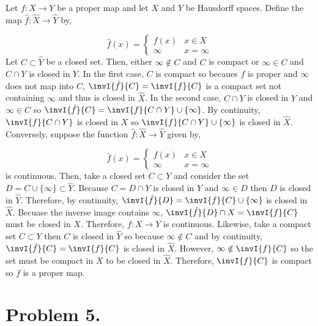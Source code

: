 \documentclass[12pt]{extarticle}
\begin{document}
Let $f : X \to Y$ be a proper map and let $X$ and $Y$ be Hausdorff spaces. Define the map $\hat{f} : \hat{X} \to \hat{Y}$ by,

\[\hat{f}(x) =
\begin{cases}
f(x) & x \in X \\
\infty & x = \infty
\end{cases}
\]
Let $C \subset \hat{Y}$ be a closed set. Then, either $\infty \notin C$ and $C$ is compact or $\infty \in C$ and $C \cap Y$ is closed in $Y$. In the first case, $C$ is compact so becaues $f$ is proper and $\infty$ does not map into $C$, $\invI{\hat{f}}{C} = \invI{f}{C}$ is a compact set not containing $\infty$ and thus is closed in $\hat{X}$. In the second case, $C \cap Y$ is closed in $Y$ and $\infty \in C$ so $\invI{\hat{f}}{C} = \invI{f}{C \cap Y} \cup \{\infty\}$. By continuity, $\invI{f}{C \cap Y}$ is closed in $X$ so $\invI{f}{C \cap Y} \cup \{\infty\}$ is closed in $\hat{X}$. \bigskip \\
Conversely, suppose the function $\hat{f} : \hat{X} \to \hat{Y}$ given by,

\[\hat{f}(x) =
\begin{cases}
f(x) & x \in X \\
\infty & x = \infty
\end{cases}
\]  
is continuous. Then, take a closed set $C \subset Y$ and consider the set $D = C \cup \{\infty\} \subset \hat{Y}$. Because $C = D \cap Y$ is closed in $Y$ and $\infty \in D$ then $D$ is closed in $\hat{Y}$. Therefore, by continuity, $\invI{\hat{f}}{D} = \invI{f}{C} \cup \{\infty\}$ is closed in $\hat{X}$. Becuase the inverse image contains $\infty$, $\invI{\hat{f}}{D} \cap X = \invI{f}{C}$ must be closed in $X$. Therefore, $f : X \to Y$ is continuous. Likewise, take a compact set $C \subset Y$ then $C$ is closed in $\hat{Y}$ so because $\infty \notin C$ and by continuity, $\invI{\hat{f}}{C} = \invI{f}{C}$ is closed in $\hat{X}$. However, $\infty \notin \invI{f}{C}$ so the set must be compact in $X$ to be closed in $\hat{X}$. Therefore, $\invI{f}{C}$ is compact so $f$ is a proper map.
           
\section*{Problem 5.}  
\end{document}
